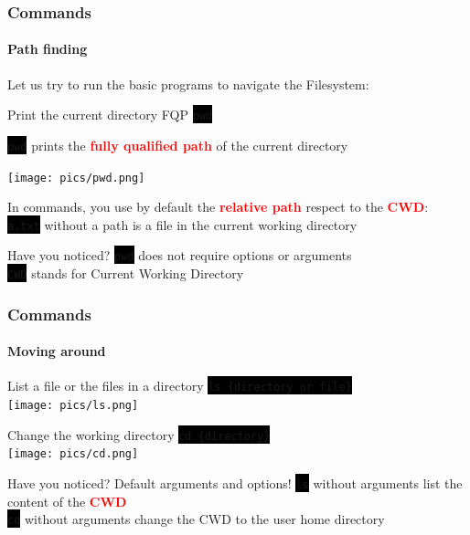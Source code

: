 \documentclass[unknownkeysallowed, 10pt, a4 paper, handout]{beamer}
\newcommand{\focus}[1]{\textbf{\textcolor{red}{#1}}}
\newcommand{\code}[1]{\colorbox{black}{\color{green}\texttt{#1}}}
\begin{document}
\begin{frame}[c]
  \frametitle{Commands}
  \framesubtitle{Path finding}

  Let us try to run the basic programs to navigate the Filesystem:
  \begin{exampleblock}{Print the current directory FQP}
    \code{pwd}
  \end{exampleblock}

  \code{pwd} prints the \focus{fully qualified path} of the current directory
  \begin{exampleblock}{}
    \begin{center}
    \texttt{[image: pics/pwd.png]}
    \end{center}
  \end{exampleblock}

  In commands, you use by default the \focus{relative path} respect to
  the \focus{CWD}: \\
  \code{a.txt} without a path is a file in the current working directory

  \begin{alertblock}{Have you noticed?}
    \code{pwd} does not require options or arguments\\
    \code{CWD} stands for Current Working Directory
  \end{alertblock}{}
\end{frame}


\begin{frame}[c]
  \frametitle{Commands}
  \framesubtitle{Moving around}

  \begin{exampleblock}{List a file or the files in a directory}
    \code{ls \{directory or file\}} \\
    \texttt{[image: pics/ls.png]}
  \end{exampleblock}

  \begin{exampleblock}{Change the working directory}
    \code{cd \{directory\}} \\
    \texttt{[image: pics/cd.png]}
  \end{exampleblock}

  \begin{alertblock}{Have you noticed? Default arguments and options!}
     \code{ls} without arguments list the content of the \focus{CWD}\\    
     \code{cd} without arguments change the CWD to the user home directory
  \end{alertblock}

\end{frame}
\end{document}
